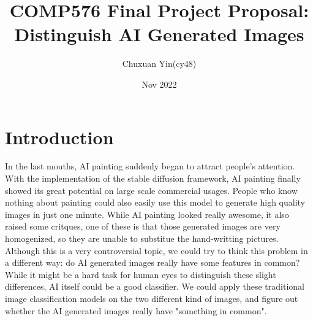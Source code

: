 \documentclass[10pt]{article}
\title{COMP576 Final Project Proposal: Distinguish AI Generated Images}
\author{Chuxuan Yin(cy48)}
\date{Nov 2022}
\begin{document}
\maketitle

\section{Introduction}

\large
In the last mouths, AI painting suddenly began to attract people's attention. With the implementation of the stable diffusion framework, AI painting
finally showed its great potential on large scale commercial usages. People who know nothing about painting could also easily use this model to generate
high quality images in just one minute. While AI painting looked really awesome, it also raised some critques, one of these is that those generated images are
very homogenized, so they are unable to substitue the hand-writting pictures. Although this is a very controversial topic, we could try to think this problem in
a different way: do AI generated images really have some features in common? While it might be a hard task for human eyes to distinguish these slight differences,
AI itself could be a good classifier. We could apply these traditional image classification models on the two different kind of images, and figure out whether
the AI generated images really have "something in common".

\vspace{10pt}
\end{document}
